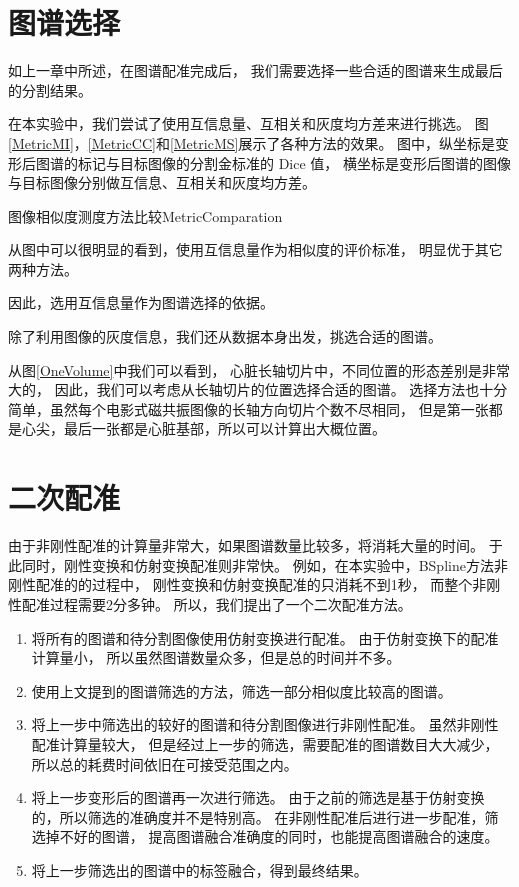 \section{图谱选择}
如上一章中所述，在图谱配准完成后，
我们需要选择一些合适的图谱来生成最后的分割结果。

在本实验中，我们尝试了使用互信息量、互相关和灰度均方差来进行挑选。
图\ref{MetricMI}，\ref{MetricCC}和\ref{MetricMS}展示了各种方法的效果。
图中，纵坐标是变形后图谱的标记与目标图像的分割金标准的 Dice 值，
横坐标是变形后图谱的图像与目标图像分别做互信息、互相关和灰度均方差。
\begin{pics}[htpb]{图像相似度测度方法比较}{MetricComparation}
\end{pics}

从图中可以很明显的看到，使用互信息量作为相似度的评价标准，
明显优于其它两种方法。

因此，选用互信息量作为图谱选择的依据。

除了利用图像的灰度信息，我们还从数据本身出发，挑选合适的图谱。

从图\ref{OneVolume}中我们可以看到，
心脏长轴切片中，不同位置的形态差别是非常大的，
因此，我们可以考虑从长轴切片的位置选择合适的图谱。
选择方法也十分简单，虽然每个电影式磁共振图像的长轴方向切片个数不尽相同，
但是第一张都是心尖，最后一张都是心脏基部，所以可以计算出大概位置。


\section{二次配准}
由于非刚性配准的计算量非常大，如果图谱数量比较多，将消耗大量的时间。
于此同时，刚性变换和仿射变换配准则非常快。
例如，在本实验中，BSpline方法非刚性配准的的过程中，
刚性变换和仿射变换配准的只消耗不到1秒，
而整个非刚性配准过程需要2分多钟。
所以，我们提出了一个二次配准方法。
\begin{enumerate}
  \item 将所有的图谱和待分割图像使用仿射变换进行配准。
    由于仿射变换下的配准计算量小，
    所以虽然图谱数量众多，但是总的时间并不多。
  \item 使用上文提到的图谱筛选的方法，筛选一部分相似度比较高的图谱。
  \item 将上一步中筛选出的较好的图谱和待分割图像进行非刚性配准。
    虽然非刚性配准计算量较大，
    但是经过上一步的筛选，需要配准的图谱数目大大减少，
    所以总的耗费时间依旧在可接受范围之内。
  \item 将上一步变形后的图谱再一次进行筛选。
    由于之前的筛选是基于仿射变换的，所以筛选的准确度并不是特别高。
    在非刚性配准后进行进一步配准，筛选掉不好的图谱，
    提高图谱融合准确度的同时，也能提高图谱融合的速度。
  \item 将上一步筛选出的图谱中的标签融合，得到最终结果。
\end{enumerate}

